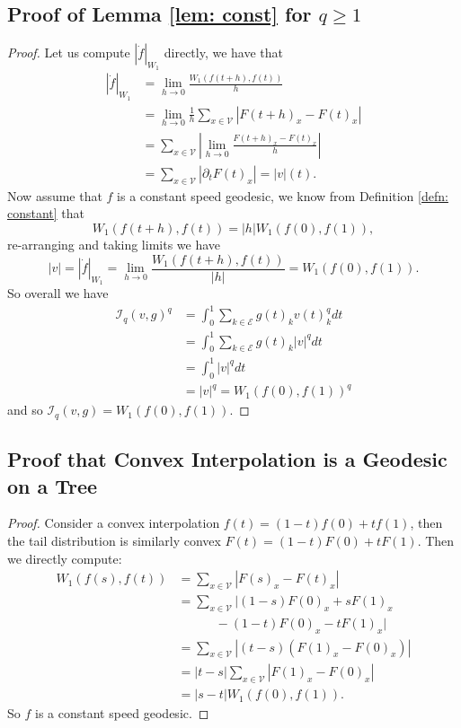 \documentclass[conference]{IEEEtran}
\newcommand{\VV}{\mathcal{V}}
\newcommand{\EE}{\mathcal{E}}
\theoremstyle{ieeestyle}
\begin{document}
\subsection{Proof of Lemma \ref{lem: const} for $q \geq 1$}\label{appendix: lem: const}
\begin{proof}
    Let us compute $|\dot{f}|_{W_1}$ directly, we have that 
    \begin{align*}
        |\dot{f}|_{W_1} &= \lim_{h \rightarrow 0} \frac{W_1(f(t+h),f(t))}{h} \\
        &=\lim_{h \rightarrow 0} \frac{1}{h}\sum_{x \in \VV} |F(t+h)_x - F(t)_x| \\
        &=  \sum_{x \in \VV} \left|\lim_{h \rightarrow 0}\frac{F(t+h)_x - F(t)_x}{h}\right| \\
        &= \sum_{x \in \VV}|\partial_t F(t)_x| =  |v|(t).
    \end{align*}
    Now assume that $f$ is a constant speed geodesic, we know from Definition \ref{defn: constant} that  \begin{equation*}
        W_1(f(t+h),f(t)) = |h| W_1(f(0),f(1)),
    \end{equation*}
     re-arranging and taking limits we have 
    \begin{equation*}
        |v| = |\dot{f}|_{W_1} = \lim_{h \rightarrow 0} \frac{W_1(f(t+h),f(t))}{|h|} = W_1(f(0),f(1)).
    \end{equation*}
    So overall we have
    \begin{align*}
        \mathcal{I}_q(v,g)^q &= \int_0^1 \sum_{k \in \EE}g(t)_kv(t)_k^q dt\\
        &= \int_0^1 \sum_{k \in \EE}g(t)_k|v|^q dt \\
        &= \int_0^1 |v|^q dt \\
        &= |v|^q = W_1(f(0),f(1))^q
    \end{align*}
    and so $\mathcal{I}_q(v,g) = W_1(f(0),f(1))$.
\end{proof}
\subsection{Proof that Convex Interpolation is a Geodesic on a Tree}\label{appendix: geodesic}
\begin{proof}
    Consider a convex interpolation $f(t) = (1-t)f(0) + tf(1)$, then the tail distribution is similarly convex $F(t) = (1-t)F(0) + tF(1)$. Then we directly compute:
    \begin{align*}
        W_1(f(s),f(t)) &= \sum_{x \in \VV}|F(s)_x - F(t)_x| \\
        &=  \sum_{x \in \VV}|(1-s)F(0)_x + sF(1)_x \\
        &\quad \quad \quad - (1-t)F(0)_x - tF(1)_x| \\
         &= \sum_{x \in \VV}|(t-s)(F(1)_x - F(0)_x)|\\
         &= |t-s|  \sum_{x \in \VV}|F(1)_x - F(0)_x| \\
         &= |s-t|W_1(f(0),f(1)).
    \end{align*}
    So $f$ is a constant speed geodesic.
\end{proof}
\end{document}
